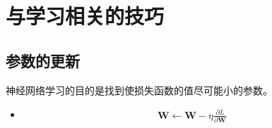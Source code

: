\documentclass[letterpaper,10pt,english]{sphinxmanual}
\begin{document}
\chapter{与学习相关的技巧}
\label{\detokenize{_u4e0e_u5b66_u4e60_u76f8_u5173_u7684_u6280_u5de7:id1}}\label{\detokenize{_u4e0e_u5b66_u4e60_u76f8_u5173_u7684_u6280_u5de7::doc}}

\section{参数的更新}
\label{\detokenize{_u4e0e_u5b66_u4e60_u76f8_u5173_u7684_u6280_u5de7:id2}}
神经网络学习的目的是找到使损失函数的值尽可能小的参数。
\begin{itemize}
\item {} 
\begin{equation*}
\begin{split}\pmb{W} \leftarrow \pmb{W} - \eta\frac{\partial{L}}{\partial\pmb{W}}\end{split}
\end{equation*}
\end{itemize}
\end{document}
